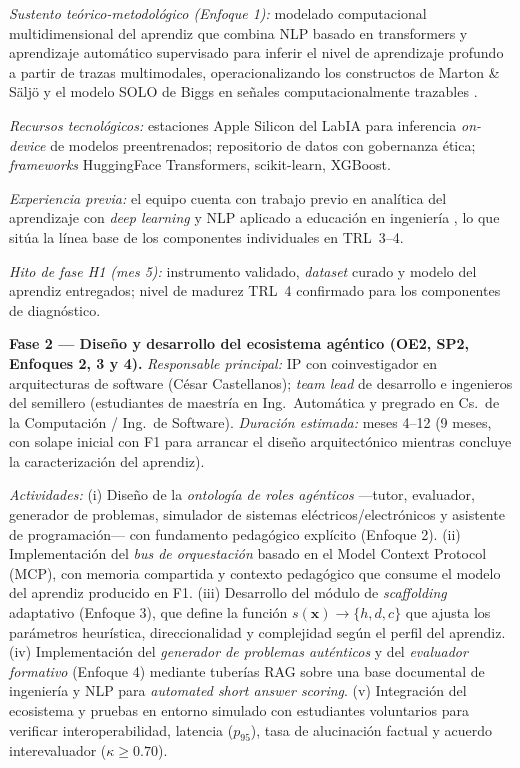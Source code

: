 \emph{Sustento teórico-metodológico (Enfoque 1):} modelado computacional
multidimensional del aprendiz que combina NLP basado en transformers y
aprendizaje automático supervisado para inferir el nivel de aprendizaje profundo
a partir de trazas multimodales, operacionalizando los constructos de Marton \&
Säljö y el modelo SOLO de Biggs en señales computacionalmente trazables
\cite{hooshyar2024systematic}.

\emph{Recursos tecnológicos:} estaciones Apple Silicon del LabIA para inferencia
\emph{on-device} de modelos preentrenados; repositorio de datos con gobernanza
ética; \emph{frameworks} HuggingFace Transformers, scikit-learn, XGBoost.

\emph{Experiencia previa:} el equipo cuenta con trabajo previo en analítica del
aprendizaje con \emph{deep learning} y NLP aplicado a educación en ingeniería
\cite{escamilla2022artificial}, lo que sitúa la línea base de los componentes
individuales en TRL~3--4.

\emph{Hito de fase H1 (mes 5):} instrumento validado, \emph{dataset} curado y
modelo del aprendiz entregados; nivel de madurez TRL~4 confirmado para los
componentes de diagnóstico.

\medskip

\noindent\textbf{Fase 2 — Diseño y desarrollo del ecosistema agéntico
(OE2, SP2, Enfoques 2, 3 y 4).}
\emph{Responsable principal:} IP con coinvestigador en arquitecturas de software
(César Castellanos); \emph{team lead} de desarrollo e ingenieros del semillero
(estudiantes de maestría en Ing.\ Automática y pregrado en Cs.\ de la Computación /
Ing.\ de Software). \emph{Duración estimada:} meses 4--12 (9 meses, con solape
inicial con F1 para arrancar el diseño arquitectónico mientras concluye la
caracterización del aprendiz).

\emph{Actividades:} (i) Diseño de la \emph{ontología de roles agénticos}
—tutor, evaluador, generador de problemas, simulador de sistemas
eléctricos/electrónicos y asistente de programación— con fundamento pedagógico
explícito (Enfoque 2). (ii) Implementación del \emph{bus de orquestación} basado
en el Model Context Protocol (MCP), con memoria compartida y contexto
pedagógico que consume el modelo del aprendiz producido en F1. (iii) Desarrollo
del módulo de \emph{scaffolding} adaptativo (Enfoque 3), que define la función
$s(\mathbf{x}) \to \{h, d, c\}$ que ajusta los parámetros heurística,
direccionalidad y complejidad según el perfil del aprendiz. (iv) Implementación
del \emph{generador de problemas auténticos} y del \emph{evaluador formativo}
(Enfoque 4) mediante tuberías RAG sobre una base documental de ingeniería y NLP
para \emph{automated short answer scoring}. (v) Integración del ecosistema y
pruebas en entorno simulado con estudiantes voluntarios para verificar
interoperabilidad, latencia ($p_{95}$), tasa de alucinación factual y acuerdo
interevaluador ($\kappa \geq 0.70$).

